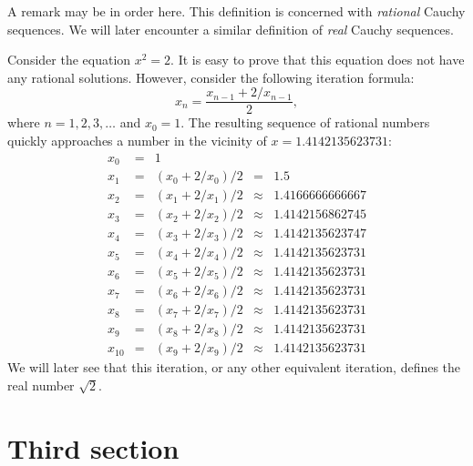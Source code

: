 \documentclass{tstextbook}
\begin{document}
	\begin{remark}
		A remark may be in order here. This definition is concerned with
		\emph{rational} Cauchy sequences. We will later encounter a similar
		definition of \emph{real} Cauchy sequences.
	\end{remark}
	
	\begin{example}[Solving the equation $x^2 = 2$]
		Consider the equation $x^2 = 2$. It is easy to prove that this
		equation does not have any rational solutions. However, consider
		the following iteration formula:
		\begin{equation}
			x_n = \frac{x_{n-1} + 2 / x_{n - 1}}{2},
		\end{equation}
		where $n = 1,2,3,\ldots$ and $x_0 = 1$. The resulting sequence of
		rational numbers quickly approaches a number in the vicinity of
		$x = 1.4142135623731$:
		\begin{displaymath}
			\begin{array}{rclcl}
				x_0 &=& 1 \\
				x_{1} &=& (x_{0} + 2 / x_{0}) / 2 &=& 1.5 \\
				x_{2} &=& (x_{1} + 2 / x_{1}) / 2 &\approx& 1.4166666666667 \\
				x_{3} &=& (x_{2} + 2 / x_{2}) / 2 &\approx& 1.4142156862745 \\
				x_{4} &=& (x_{3} + 2 / x_{3}) / 2 &\approx& 1.4142135623747 \\
				x_{5} &=& (x_{4} + 2 / x_{4}) / 2 &\approx& 1.4142135623731 \\
				x_{6} &=& (x_{5} + 2 / x_{5}) / 2 &\approx& 1.4142135623731 \\
				x_{7} &=& (x_{6} + 2 / x_{6}) / 2 &\approx& 1.4142135623731 \\
				x_{8} &=& (x_{7} + 2 / x_{7}) / 2 &\approx& 1.4142135623731 \\
				x_{9} &=& (x_{8} + 2 / x_{8}) / 2 &\approx& 1.4142135623731 \\
				x_{10} &=& (x_{9} + 2 / x_{9}) / 2 &\approx& 1.4142135623731
			\end{array}
		\end{displaymath}
		We will later see that this iteration, or any other equivalent
		iteration, defines the real number $\sqrt{2}$.
	\end{example}
	
	\section{Third section}
	
\end{document}
